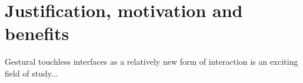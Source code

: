 
\section{Justification, motivation and benefits}
Gestural touchless interfaces as a relatively new form of interaction is an exciting field of study... 


